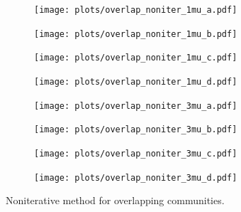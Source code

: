 \begin{figure}
    \centering
    \begin{subfigure}{0.5\textwidth}
    \texttt{[image: plots/overlap\_noniter\_1mu\_a.pdf]}
    \end{subfigure}%
    \begin{subfigure}{0.5\textwidth}
    \texttt{[image: plots/overlap\_noniter\_1mu\_b.pdf]}
    \end{subfigure}
    \begin{subfigure}{0.5\textwidth}
    \texttt{[image: plots/overlap\_noniter\_1mu\_c.pdf]}
    \end{subfigure}%
    \begin{subfigure}{0.5\textwidth}
    \texttt{[image: plots/overlap\_noniter\_1mu\_d.pdf]}
    \end{subfigure}
    \begin{subfigure}{0.5\textwidth}
    \texttt{[image: plots/overlap\_noniter\_3mu\_a.pdf]}
    \end{subfigure}%
    \begin{subfigure}{0.5\textwidth}
    \texttt{[image: plots/overlap\_noniter\_3mu\_b.pdf]}
    \end{subfigure}
    \begin{subfigure}{0.5\textwidth}
    \texttt{[image: plots/overlap\_noniter\_3mu\_c.pdf]}
    \end{subfigure}%
    \begin{subfigure}{0.5\textwidth}
    \texttt{[image: plots/overlap\_noniter\_3mu\_d.pdf]}
    \end{subfigure}
    \caption{Noniterative method for overlapping communities.}
\end{figure}


